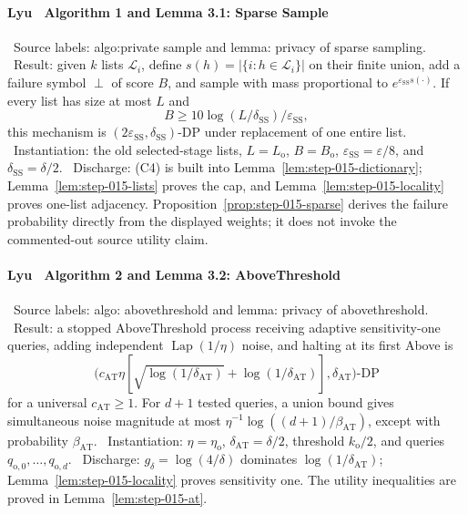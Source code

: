 \paragraph{Lyu~\citep{lyu2025} Algorithm 1 and Lemma 3.1: Sparse Sample}

\noindent\textbullet\ Source labels: algo:private sample and
  lemma: privacy of sparse sampling.
\noindent\textbullet\ Result: given \(k\) lists \(\mathcal L_i\), define
  \(s(h)=|\{i:h\in\mathcal L_i\}|\) on their finite union, add a failure
  symbol \(\perp\) of score \(B\), and sample with mass proportional to
  \(e^{\varepsilon_{\mathrm{SS}}s(\cdot)}\). If every list has size at
  most \(L\) and
  \[
  B\ge10\log(L/\delta_{\mathrm{SS}})
       /\varepsilon_{\mathrm{SS}},
  \tag{C4}
  \]
  this mechanism is
  \((2\varepsilon_{\mathrm{SS}},\delta_{\mathrm{SS}})\)-DP under
  replacement of one entire list.
\noindent\textbullet\ Instantiation: the old selected-stage lists, \(L=L_{\mathrm o}\),
  \(B=B_{\mathrm o}\), \(\varepsilon_{\mathrm{SS}}=\varepsilon/8\), and
  \(\delta_{\mathrm{SS}}=\delta/2\).
\noindent\textbullet\ Discharge: (C4) is built into Lemma~\ref{lem:step-015-dictionary};
  Lemma~\ref{lem:step-015-lists} proves the cap, and
  Lemma~\ref{lem:step-015-locality} proves one-list adjacency.
  Proposition~\ref{prop:step-015-sparse} derives the failure probability
  directly from the displayed weights; it does not invoke the commented-out
  source utility claim.

\paragraph{Lyu~\citep{lyu2025} Algorithm 2 and Lemma 3.2: AboveThreshold}

\noindent\textbullet\ Source labels: algo: abovethreshold and
  lemma: privacy of abovethreshold.
\noindent\textbullet\ Result: a stopped AboveThreshold process receiving adaptive
  sensitivity-one queries, adding independent
  \(\operatorname{Lap}(1/\eta)\) noise, and halting at its first Above is
  \[
  \bigl(c_{\mathrm{AT}}\eta
  [\sqrt{\log(1/\delta_{\mathrm{AT}})}
    +\log(1/\delta_{\mathrm{AT}})],
  \delta_{\mathrm{AT}}\bigr)\text{-DP}
  \tag{C5}
  \]
  for a universal \(c_{\mathrm{AT}}\ge1\). For \(d+1\) tested queries,
  a union bound gives simultaneous noise magnitude at most
  \(\eta^{-1}\log((d+1)/\beta_{\mathrm{AT}})\), except with probability
  \(\beta_{\mathrm{AT}}\).
\noindent\textbullet\ Instantiation: \(\eta=\eta_{\mathrm o}\),
  \(\delta_{\mathrm{AT}}=\delta/2\), threshold \(k_{\mathrm o}/2\), and
  queries \(q_{\mathrm o,0},\ldots,q_{\mathrm o,d}\).
\noindent\textbullet\ Discharge: \(g_\delta=\log(4/\delta)\) dominates
  \(\log(1/\delta_{\mathrm{AT}})\);
  Lemma~\ref{lem:step-015-locality} proves sensitivity one. The utility
  inequalities are proved in Lemma~\ref{lem:step-015-at}.

